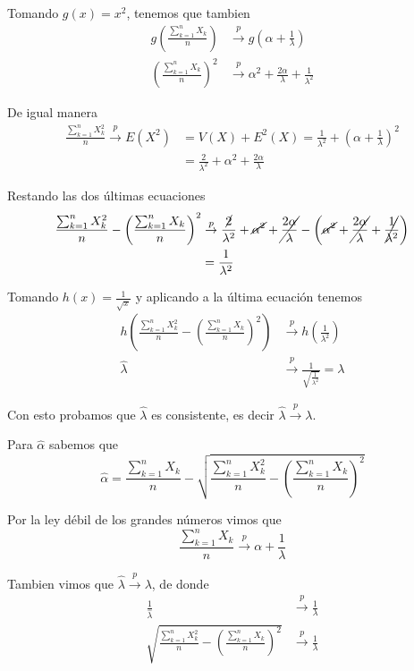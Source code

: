 \documentclass[a4paper,10pt]{article}
\begin{document}
Tomando $g(x) = x^2$, tenemos que tambien
\[
\begin{align*}
g\left(\frac{\sum_{k=1}^n X_k}{n}\right) &\overset{p}{\rightarrow} g\left(\alpha + \frac{1}{\lambda}\right) \\
\left(\frac{\sum_{k=1}^n X_k}{n}\right)^2 &\overset{p}{\rightarrow} \alpha^2 + \frac{2\alpha}{\lambda} + \frac{1}{\lambda^2}
\end{align*}
\]

De igual manera
\[
\begin{align*}
\frac{\sum_{k=1}^n X_k^2}{n} \overset{p}{\rightarrow} E(X^2) 
&= V(X) + E^2(X) = \frac{1}{\lambda^2} + \left(\alpha + \frac{1}{\lambda}\right)^2 \\
&= \frac{2}{\lambda^2} + \alpha^2 + \frac{2\alpha}{\lambda}
\end{align*}
\]

Restando las dos últimas ecuaciones
\[
\begin{align*}
\frac{\sum_{k=1}^n X_k^2}{n} - \left(\frac{\sum_{k=1}^n X_k}{n}\right)^2 &\overset{p}{\rightarrow} 
\frac{\cancel{2}}{\lambda^2} + \cancel{\alpha^2} + \cancel{\frac{2\alpha}{\lambda}} 
- \left(\cancel{\alpha^2} + \cancel{\frac{2\alpha}{\lambda}} + \cancel{\frac{1}{\lambda^2}}\right) \\
&= \frac{1}{\lambda^2}
\end{align*}
\]

Tomando $h(x) = \frac{1}{\sqrt{x}}$ y aplicando a la última ecuación tenemos
\[
\begin{align*}
h\left(\frac{\sum_{k=1}^n X_k^2}{n} - \left(\frac{\sum_{k=1}^n X_k}{n}\right)^2 \right) &\overset{p}{\rightarrow} 
h\left(\frac{1}{\lambda^2}\right) \\
\hat\lambda &\overset{p}{\rightarrow} \frac{1}{\sqrt{\frac{1}{\lambda^2}}} = \lambda
\end{align*}
\]

Con esto probamos que $\hat\lambda$ es consistente, es decir $\hat\lambda \overset{p}{\rightarrow} \lambda$.

Para $\hat\alpha$ sabemos que 
\[
\hat\alpha = \frac{\sum_{k=1}^n X_k}{n} - \sqrt{\frac{\sum_{k=1}^n X_k^2}{n}  - \left(\frac{\sum_{k=1}^n X_k}{n}\right)^2}
\]

Por la ley débil de los grandes números vimos que
\[
\frac{\sum_{k=1}^n X_k}{n} \overset{p}{\rightarrow} \alpha + \frac{1}{\lambda}
\]

Tambien vimos que $\hat\lambda \overset{p}{\rightarrow} \lambda$, de donde
\[
\begin{align*}
\frac{1}{\hat\lambda} &\overset{p}{\rightarrow} \frac{1}{\lambda} \\
\sqrt{\frac{\sum_{k=1}^n X_k^2}{n}  - \left(\frac{\sum_{k=1}^n X_k}{n}\right)^2} 
&\overset{p}{\rightarrow} \frac{1}{\lambda}
\end{align*}
\]
\end{document}
